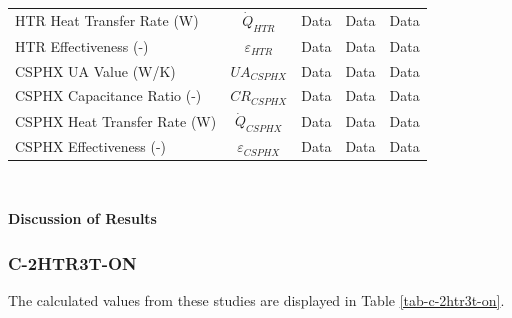 \begin{paracol}{2}
\begin{specialtable}[H]
\begin{tabular}{lcccc}
    HTR Heat Transfer Rate (W)	&	$\dot{Q}_{HTR}$	&	Data	&	Data	&	Data	\\
    HTR Effectiveness (-)	&	$\varepsilon_{HTR}$	&	Data	&	Data	&	Data	\\
    CSPHX UA Value (W/K)	&	$UA_{CSPHX}$	&	Data	&	Data	&	Data	\\
    CSPHX Capacitance Ratio (-)	&	$CR_{CSPHX}$	&	Data	&	Data	&	Data	\\
    CSPHX Heat Transfer Rate (W)	&	$\dot{Q}_{CSPHX}$	&	Data	&	Data	&	Data	\\
    CSPHX Effectiveness (-)	&	$\varepsilon_{CSPHX}$	&	Data	&	Data	&	Data	\\
    \bottomrule
    \end{tabular}\\
\end{specialtable}

\textbf{Discussion of Results}

\subsubsection{C-2HTR3T-ON}

The calculated values from these studies are displayed in Table \ref{tab-c-2htr3t-on}.


\end{paracol}
